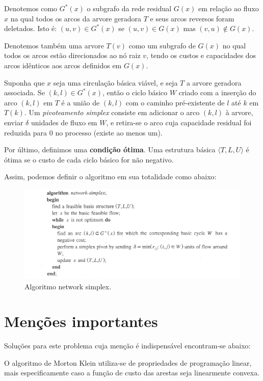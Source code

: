 \documentclass[12pt, a4]{article}
\begin{document}
Denotemos como $G^*(x)$ o subgrafo da rede residual $G(x)$ em relação ao fluxo
$x$ na qual todos os arcos da arvore geradora $T$ e seus arcos reversos foram
deletados. Isto é: $(u,v) \in G^*(x)$ se $(u,v) \in G(x)$ mas
$(v,u) \notin G(x)$.

Denotemos também uma arvore $T(v)$ como um subgrafo de $G(x)$ no qual todos os
arcos estão direcionados ao nó raiz $v$, tendo os custos e capacidades dos arcos
idênticos aos arcos definidos em $G(x)$.

Suponha que $x$ seja uma circulação básica viável, e seja $T$ a arvore geradora
associada. Se $(k,l) \in G^*(x)$, então o ciclo básico $W$ criado com a inserção
do arco $(k,l)$ em $T$ é a união de $(k,l)$ com o caminho pré-existente de $l$
até $k$ em $T(k)$. Um \textit{pivoteamento simplex} consiste em adicionar o arco
$(k,l)$ à arvore, enviar $\delta$ unidades de fluxo em $W$, e retira-se o arco
cuja capacidade residual foi reduzida para $0$ no processo (existe ao menos um).

Por último, definimos uma \textbf{condição ótima}. Uma estrutura básica
$\langle T,L,U \rangle$ é ótima se o custo de cada ciclo básico for não
negativo.

Assim, podemos definir o algoritmo em sua totalidade como abaixo:

\begin{figure}[H]
  \includegraphics[width=\linewidth]{simplex.png}
  \caption{Algoritmo network simplex.}
  \label{fig:alg}
\end{figure}

\section{Menções importantes}

Soluções para este problema cuja menção é indispensável encontram-se abaixo:

O algoritmo de Morton Klein utiliza-se de propriedades de programação linear,
mais especificamente caso a função de custo das arestas seja linearmente
convexa.
\end{document}
